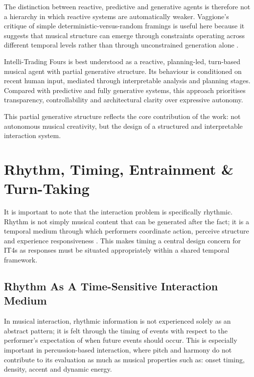 The distinction between reactive, predictive and generative agents is
therefore not a hierarchy in which reactive systems are automatically
weaker. Vaggione's critique of simple deterministic-versus-random
framings is useful here because it suggests that musical structure can
emerge through constraints operating across different temporal levels
rather than through unconstrained generation alone \citep{vaggione1993determinism}.

Intelli-Trading Fours is best understood as a reactive, planning-led,
turn-based musical agent with partial generative structure. Its
behaviour is conditioned on recent human input, mediated through
interpretable analysis and planning stages. Compared with predictive and
fully generative systems, this approach prioritises transparency,
controllability and architectural clarity over expressive autonomy.

This partial generative structure reflects the core contribution of the
work: not autonomous musical creativity, but the design of a structured
and interpretable interaction system.

\section{Rhythm, Timing, Entrainment \& Turn-Taking}\label{rhythm-timing-entrainment-turn-taking}

It is important to note that the interaction problem is specifically
rhythmic. Rhythm is not simply musical content that can be generated
after the fact; it is a temporal medium through which performers
coordinate action, perceive structure and experience responsiveness
\citep{longuetHiggins1984rhythmic}. This makes timing a central design
concern for IT4s as responses must be situated appropriately within a
shared temporal framework.

\subsection{Rhythm As A Time-Sensitive Interaction Medium}\label{rhythm-as-a-time-sensitive-interaction-medium}

In musical interaction, rhythmic information is not experienced solely
as an abstract pattern; it is felt through the timing of events with
respect to the performer's expectation of when future events should
occur. This is especially important in percussion-based interaction,
where pitch and harmony do not contribute to its evaluation as much as
musical properties such as: onset timing, density, accent and dynamic
energy.

